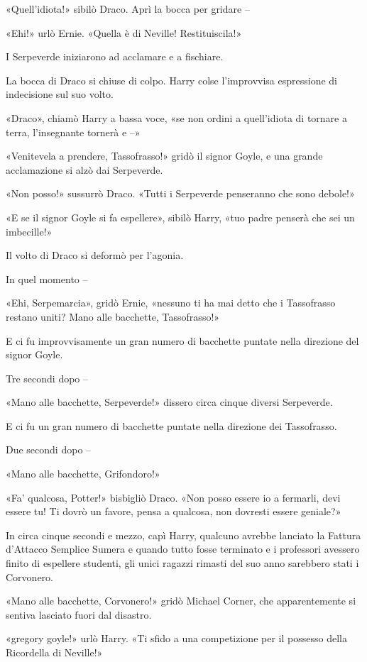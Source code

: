 «Quell’idiota!» sibilò Draco. Aprì la bocca per gridare –

«Ehi!» urlò Ernie. «Quella è di Neville! Restituiscila!»

I Serpeverde iniziarono ad acclamare e a fischiare.

La bocca di Draco si chiuse di colpo. Harry colse l’improvvisa espressione di indecisione sul suo volto.

«Draco», chiamò Harry a bassa voce, «se non ordini a quell’idiota di tornare a terra, l’insegnante tornerà e –»

«Venitevela a prendere, Tassofrasso!» gridò il signor Goyle, e una grande acclamazione si alzò dai Serpeverde.

«Non posso!» sussurrò Draco. «Tutti i Serpeverde penseranno che sono debole!»

«E se il signor Goyle si fa espellere», sibilò Harry, «tuo padre penserà che sei un imbecille!»

Il volto di Draco si deformò per l’agonia.

In quel momento –

«Ehi, Serpemarcia», gridò Ernie, «nessuno ti ha mai detto che i Tassofrasso restano uniti? Mano alle bacchette, Tassofrasso!»

E ci fu improvvisamente un gran numero di bacchette puntate nella direzione del signor Goyle.

Tre secondi dopo –

«Mano alle bacchette, Serpeverde!» dissero circa cinque diversi Serpeverde.

E ci fu un gran numero di bacchette puntate nella direzione dei Tassofrasso.

Due secondi dopo –

«Mano alle bacchette, Grifondoro!»

«Fa’ qualcosa, Potter!» bisbigliò Draco. «Non posso essere io a fermarli, devi essere tu! Ti dovrò un favore, pensa a qualcosa, non dovresti essere geniale?»

In circa cinque secondi e mezzo, capì Harry, qualcuno avrebbe lanciato la Fattura d’Attacco Semplice Sumera e quando tutto fosse terminato e i professori avessero finito di espellere studenti, gli unici ragazzi rimasti del suo anno sarebbero stati i Corvonero.

«Mano alle bacchette, Corvonero!» gridò Michael Corner, che apparentemente si sentiva lasciato fuori dal disastro.

«gregory goyle!» urlò Harry. «Ti sfido a una competizione per il possesso della Ricordella di Neville!»


